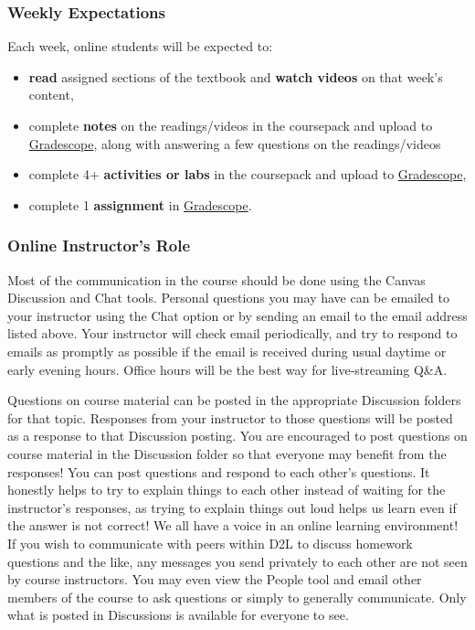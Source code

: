 \documentclass[
]{article}
\providecommand{\tightlist}{%
  \setlength{\itemsep}{0pt}\setlength{\parskip}{0pt}}
\begin{document}
\subsubsection{Weekly Expectations}\label{weekly-expectations}

Each week, online students will be expected to:

\begin{itemize}
\tightlist
\item
  \textbf{read} assigned sections of the textbook and \textbf{watch
  videos} on that week's content,
\item
  complete \textbf{notes} on the readings/videos in the coursepack and
  upload to \href{https://www.gradescope.com/}{Gradescope}, along with
  answering a few questions on the readings/videos
\item
  complete 4+ \textbf{activities or labs} in the coursepack and upload
  to \href{https://www.gradescope.com/}{Gradescope},
\item
  complete 1 \textbf{assignment} in
  \href{https://www.gradescope.com/}{Gradescope}.
\end{itemize}

\subsubsection{Online Instructor's Role}\label{online-instructors-role}

Most of the communication in the course should be done using the Canvas
Discussion and Chat tools. Personal questions you may have can be
emailed to your instructor using the Chat option or by sending an email
to the email address listed above. Your instructor will check email
periodically, and try to respond to emails as promptly as possible if
the email is received during usual daytime or early evening hours.
Office hours will be the best way for live-streaming Q\&A.

Questions on course material can be posted in the appropriate Discussion
folders for that topic. Responses from your instructor to those
questions will be posted as a response to that Discussion posting. You
are encouraged to post questions on course material in the Discussion
folder so that everyone may benefit from the responses! You can post
questions and respond to each other's questions. It honestly helps to
try to explain things to each other instead of waiting for the
instructor's responses, as trying to explain things out loud helps us
learn even if the answer is not correct! We all have a voice in an
online learning environment! If you wish to communicate with peers
within D2L to discuss homework questions and the like, any messages you
send privately to each other are not seen by course instructors. You may
even view the People tool and email other members of the course to ask
questions or simply to generally communicate. Only what is posted in
Discussions is available for everyone to see.
\end{document}
